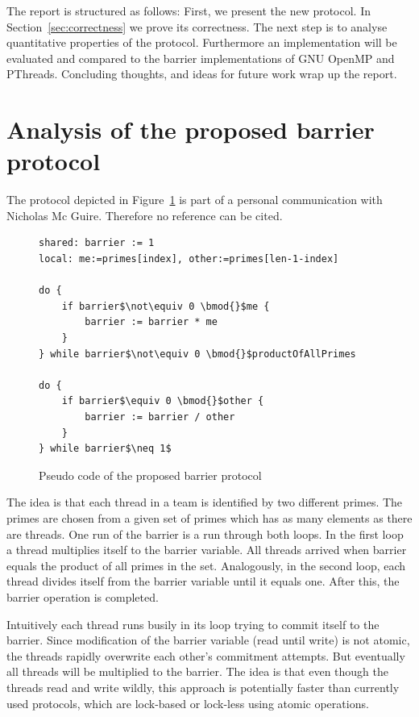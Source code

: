 \documentclass[a4paper, 10pt]{article}
\begin{document}
The report is structured as follows: First, we present the new protocol. In Section~\ref{sec:correctness} we prove its correctness. The next step is to analyse quantitative properties of the protocol. Furthermore an implementation will be evaluated and compared to the barrier implementations of GNU OpenMP\cite{gomp} and PThreads\cite{glibc}. Concluding thoughts, and ideas for future work wrap up the report.

\section{Analysis of the proposed barrier protocol}
The protocol depicted in Figure~\ref{fig:original-barrier-source-code} is part of a personal communication with Nicholas Mc Guire. Therefore no reference can be cited.

\begin{figure}[htbp]
	\centering
	\begin{lstlisting}[mathescape]
shared: barrier := 1
local: me:=primes[index], other:=primes[len-1-index]

do {
	if barrier$\not\equiv 0 \bmod{}$me {
		barrier := barrier * me
	}
} while barrier$\not\equiv 0 \bmod{}$productOfAllPrimes

do {
	if barrier$\equiv 0 \bmod{}$other {
		barrier := barrier / other
	}
} while barrier$\neq 1$
	\end{lstlisting}
	\caption{Pseudo code of the proposed barrier protocol}
	\label{fig:original-barrier-source-code}
\end{figure}
The idea is that each thread in a team is identified by two different primes. The primes are chosen from a given set of primes which has
as many elements as there are threads. One run of the barrier is a run through both loops. In the first loop a thread multiplies itself to the barrier variable. All threads arrived when barrier equals the product of all primes in the set. Analogously, in the second loop, each thread divides itself from the barrier variable until it equals one. After this, the barrier operation is completed.

Intuitively each thread runs busily in its loop trying to commit itself to the barrier. Since modification of the barrier variable (read until write) is not atomic, the threads rapidly overwrite each other's commitment attempts. But eventually all threads will be multiplied to the barrier. The idea is that even though the threads read and write wildly, this approach is potentially faster than currently used protocols, which are lock-based or lock-less using atomic operations.
\end{document}
